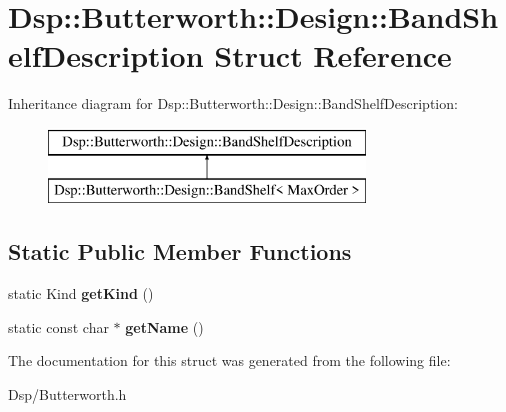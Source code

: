 \hypertarget{structDsp_1_1Butterworth_1_1Design_1_1BandShelfDescription}{\section{Dsp\-:\-:Butterworth\-:\-:Design\-:\-:Band\-Shelf\-Description Struct Reference}
\label{structDsp_1_1Butterworth_1_1Design_1_1BandShelfDescription}
}
Inheritance diagram for Dsp\-:\-:Butterworth\-:\-:Design\-:\-:Band\-Shelf\-Description\-:\begin{figure}[H]
\begin{center}
\leavevmode
\includegraphics[height=2.000000cm]{structDsp_1_1Butterworth_1_1Design_1_1BandShelfDescription}
\end{center}
\end{figure}
\subsection*{Static Public Member Functions}
\begin{DoxyCompactItemize}
\item 
\hypertarget{structDsp_1_1Butterworth_1_1Design_1_1BandShelfDescription_a0041157c9af06602aedd23ae246df239}{static Kind {\bfseries get\-Kind} ()}\label{structDsp_1_1Butterworth_1_1Design_1_1BandShelfDescription_a0041157c9af06602aedd23ae246df239}

\item 
\hypertarget{structDsp_1_1Butterworth_1_1Design_1_1BandShelfDescription_a0f67b8aa9abb862211a922ffbec51343}{static const char $\ast$ {\bfseries get\-Name} ()}\label{structDsp_1_1Butterworth_1_1Design_1_1BandShelfDescription_a0f67b8aa9abb862211a922ffbec51343}

\end{DoxyCompactItemize}


The documentation for this struct was generated from the following file\-:\begin{DoxyCompactItemize}
\item 
Dsp/Butterworth.\-h\end{DoxyCompactItemize}
